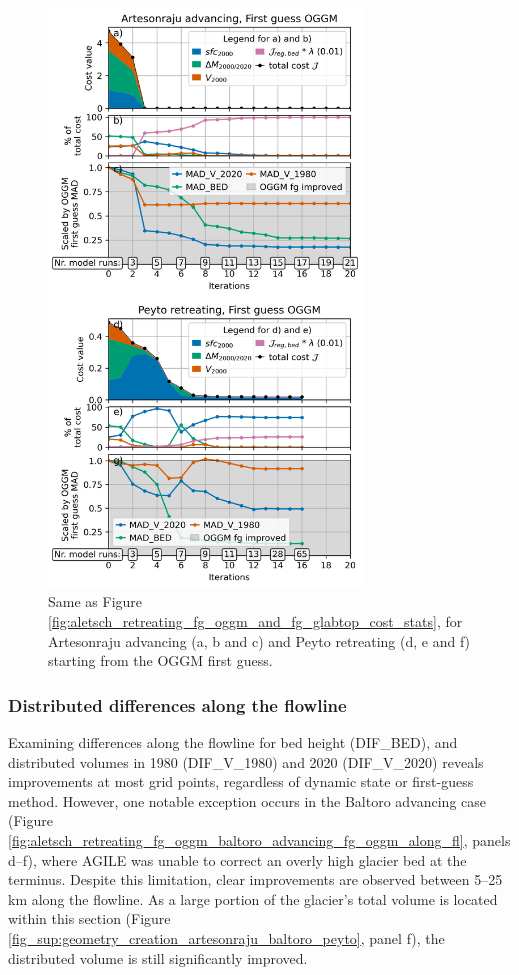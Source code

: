 \documentclass[journal abbreviation, manuscript]{copernicus}
\begin{document}
\begin{figure}
    \centering
    \includegraphics[width=8.3cm]{fig08.png}
    \caption{Same as Figure \ref{fig:aletsch_retreating_fg_oggm_and_fg_glabtop_cost_stats}, for Artesonraju advancing (a, b and c) and Peyto retreating (d, e and f) starting from the OGGM first guess.}
    \label{fig:aletsch_eq_peyto_re_fg_oggm}
\end{figure}

\subsubsection{Distributed differences along the flowline}
\label{subsec:Diff_along_fl_all_glacier_geometries_dynamic_states}

Examining differences along the flowline for bed height (DIF\_BED), and distributed volumes in 1980 (DIF\_V\_1980) and 2020 (DIF\_V\_2020) reveals improvements at most grid points, regardless of dynamic state or first-guess method. However, one notable exception occurs in the Baltoro advancing case (Figure \ref{fig:aletsch_retreating_fg_oggm_baltoro_advancing_fg_oggm_along_fl}, panels d–f), where AGILE was unable to correct an overly high glacier bed at the terminus. Despite this limitation, clear improvements are observed between 5–25 km along the flowline. As a large portion of the glacier’s total volume is located within this section (Figure \ref{fig_sup:geometry_creation_artesonraju_baltoro_peyto}, panel f), the distributed volume is still significantly improved.
\end{document}
